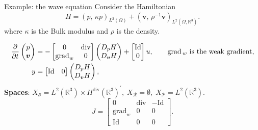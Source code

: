 \documentclass[aspectratio=169]{beamer}
\DeclareMathOperator*{\grad}{grad}
\renewcommand{\div}{\operatorname{div}}
\newcommand{\bbR}{\mathbb{R}}
\newcommand{\inpr}[3][]{\ensuremath{( #2, \, #3 )_{#1}}}
\begin{document}
\begin{frame}{Example: the wave equation}
	Consider the Hamiltonian
	\begin{equation*}
		{H} = \inpr[L^2(\Omega)]{p}{\kappa p} + \inpr[L^2(\Omega, \bbR^3)]{\bm{v}}{\rho^{-1}\bm{v}}.
	\end{equation*}
	where $\kappa$ is the Bulk modulus and $\rho$ is the density. \\
	\vspace{.3cm}
	\begin{tcolorbox}[nobeforeafter, colframe=theme,title=The wave equation on $\bbR^3$ with distributed input]%
	\begin{equation*}
		\begin{aligned}
			\diffp{}{t}
			\begin{pmatrix}
				p \\
				\bm{v} \\
			\end{pmatrix} &=-
			\begin{bmatrix}
				0 & \div \\
				\grad_w & 0
			\end{bmatrix}
			\begin{pmatrix}
				D_p{H} \\
				D_{\bm{v}}{H}\\
			\end{pmatrix} + \begin{bmatrix}
				\mathrm{Id} \\
				0
			\end{bmatrix} u, \qquad \grad{}_{w} \text{ is the weak gradient},\\
			y &= \begin{bmatrix}
				\mathrm{Id} & 0
			\end{bmatrix} \begin{pmatrix}
				D_p{H} \\
				D_{\bm{v}}{H}\\
			\end{pmatrix},
		\end{aligned}
	\end{equation*}
	\textbf{Spaces}: $X_{\mathcal{S}}= L^2(\bbR^3) \times H^{\div}(\bbR^3)^{'}, \; X_{\mathcal{R}} = \emptyset, \; X_{\mathcal{P}}= L^{2}(\bbR^3)$.
	\begin{equation*}
		J = \begin{bmatrix}
			0 & \div & - \mathrm{Id} \\
			\grad_w & 0 & 0 \\
			\mathrm{Id} & 0 & 0 
		\end{bmatrix}.
	\end{equation*}
	\end{tcolorbox} 
	


\end{frame}
\end{document}
